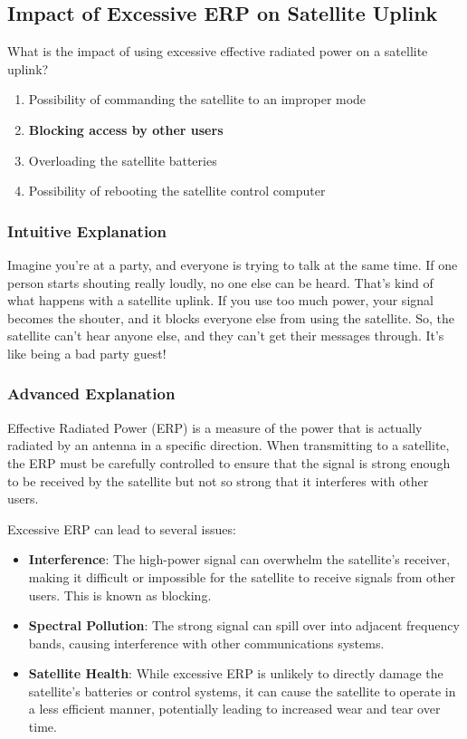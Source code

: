 \subsection{Impact of Excessive ERP on Satellite Uplink}
\label{T8B02}

\begin{tcolorbox}[colback=gray!10!white,colframe=black!75!black,title=T8B02]
What is the impact of using excessive effective radiated power on a satellite uplink?
\begin{enumerate}[label=\Alph*)]
    \item Possibility of commanding the satellite to an improper mode
    \item \textbf{Blocking access by other users}
    \item Overloading the satellite batteries
    \item Possibility of rebooting the satellite control computer
\end{enumerate}
\end{tcolorbox}

\subsubsection*{Intuitive Explanation}
Imagine you're at a party, and everyone is trying to talk at the same time. If one person starts shouting really loudly, no one else can be heard. That's kind of what happens with a satellite uplink. If you use too much power, your signal becomes the shouter, and it blocks everyone else from using the satellite. So, the satellite can't hear anyone else, and they can't get their messages through. It's like being a bad party guest!

\subsubsection*{Advanced Explanation}
Effective Radiated Power (ERP) is a measure of the power that is actually radiated by an antenna in a specific direction. When transmitting to a satellite, the ERP must be carefully controlled to ensure that the signal is strong enough to be received by the satellite but not so strong that it interferes with other users.

Excessive ERP can lead to several issues:
\begin{itemize}
    \item \textbf{Interference}: The high-power signal can overwhelm the satellite's receiver, making it difficult or impossible for the satellite to receive signals from other users. This is known as blocking.
    \item \textbf{Spectral Pollution}: The strong signal can spill over into adjacent frequency bands, causing interference with other communications systems.
    \item \textbf{Satellite Health}: While excessive ERP is unlikely to directly damage the satellite's batteries or control systems, it can cause the satellite to operate in a less efficient manner, potentially leading to increased wear and tear over time.
\end{itemize}

